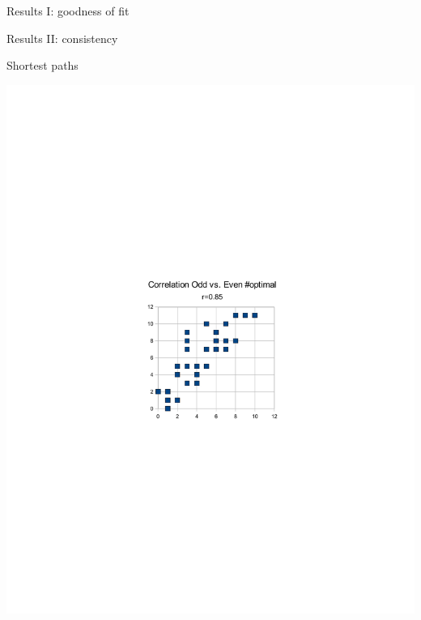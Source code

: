 \documentclass[xcolor=table]{beamer}
\begin{document}
\begin{frame}{Results I: goodness of fit}
\end{frame}

\begin{frame}{Results II: consistency}
\end{frame}

\begin{frame}{Shortest paths}
\centerline{
 \includegraphics[trim= 10cm 10cm 10cm 10cm,height=.9\textheight]{numbershortest.pdf}}
\end{frame}
\end{document}
